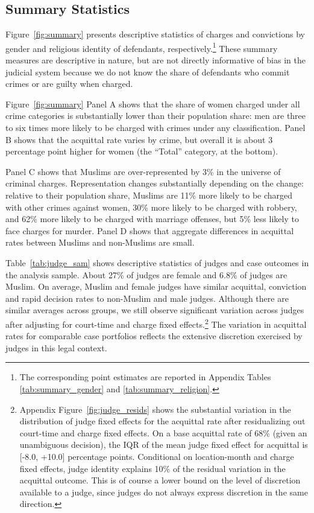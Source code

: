 \documentclass[12pt,english]{article}
\begin{document}
\subsection{Summary Statistics}

Figure~\ref{fig:summary}  presents descriptive statistics of charges and convictions by gender and religious identity of defendants, respectively.\footnote{The corresponding point estimates are reported in Appendix Tables \ref{tab:summary_gender} and \ref{tab:summary_religion}.} These summary measures are descriptive in nature, but are not directly informative of bias in the judicial system because we do not know the share of defendants who commit crimes or are guilty when charged.

Figure~\ref{fig:summary} Panel A shows that the share of women charged under all crime categories is substantially lower than their population share: men are three to six times more likely to be charged with crimes under any classification. Panel B shows that the acquittal rate varies by crime, but overall it is about 3 percentage point higher for women (the ``Total'' category, at the bottom). 

Panel C shows that Muslims are over-represented by 3\% in the universe of criminal charges. Representation changes substantially depending on the change: relative to their population share, Muslims are 11\% more likely to be charged with other crimes against women, 30\% more likely to be charged with robbery, and 62\% more likely to be charged with marriage offenses, but 5\% less likely to face charges for murder. Panel D shows that aggregate differences in acquittal rates between Muslims and non-Muslims are small.

Table~\ref{tab:judge_sam} shows descriptive statistics of judges and case outcomes in the analysis sample. About 27\% of judges are female and 6.8\% of judges are Muslim. On average, Muslim and female judges have similar acquittal, conviction and rapid decision rates to non-Muslim and male judges. Although there are similar averages across groups, we still observe significant variation across judges after adjusting for court-time and charge fixed effects.\footnote{Appendix Figure~\ref{fig:judge_resids} shows the substantial variation in the distribution of judge fixed effects for the acquittal rate after residualizing out court-time and charge fixed effects. On a base acquittal rate of 68\% (given an unambiguous decision), the IQR of the mean judge fixed effect for acquittal is [-8.0, +10.0] percentage points. Conditional on location-month and charge fixed effects, judge identity explains 10\% of the residual variation in the acquittal outcome. This is of course a lower bound on the level of discretion available to a judge, since judges do not always express discretion in the same direction.} The variation in acquittal rates for comparable case portfolios reflects the extensive discretion exercised by judges in this legal context.
\end{document}

